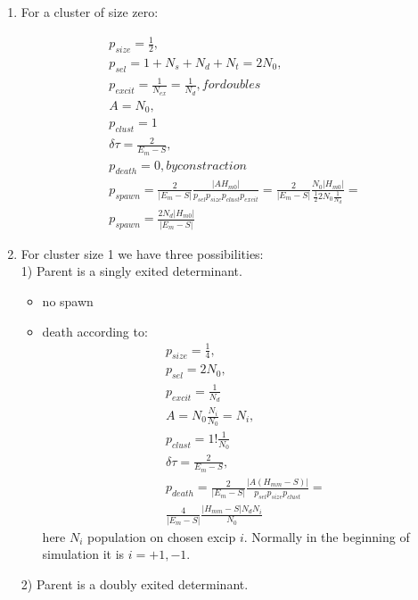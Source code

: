 \documentclass[twoside,english]{uiofysmaster}
\theoremstyle{definition}
\begin{document}
\begin{enumerate}
\item For a cluster of size zero:

\begin{align}
p_{size} = \frac{1}{2},\\
p_{sel} = 1+N_{s}+N_{d}+N_{t} = 2N_0,\\
p_{excit}=\frac{1}{N_{ex}} = \frac{1}{N_d}, for doubles\\
A = N_0,\\
p_{clust}=1\\
\delta \tau = \frac{2}{E_m  - S},\\
p_{death}=0, by constraction\\
p_{spawn} = \frac{2}{|E_m  - S|} \frac{|AH_{m0}|}{ p_{sel}  p_{size} p_{clust}p_{excit} }=
\frac{2}{|E_m  - S|} \frac{N_0|H_{m0}|}{ \frac{1}{2}  2N_0 \frac{1}{N_d} }=\\
p_{spawn} = \frac{2N_d|H_{m0}|}{|E_m  - S|} 
\end{align}
 
\item For cluster size 1 we have three possibilities:\\
1) Parent is a singly exited determinant.

\begin{itemize}
	\item no spawn
	\item death according to:
\begin{align}
p_{size} = \frac{1}{4},\\
p_{sel} =  2N_0,\\
p_{excit}= \frac{1}{N_d}\\
A = N_0\frac{N_i}{N_0}=N_i,\\
p_{clust}=1!\frac{1}{N_0}\\
\delta \tau = \frac{2}{E_m  - S},\\
p_{death} = \frac{2}{|E_m - S|} \frac{|A(H_{mm}-S)|}{ p_{sel}  p_{size} p_{clust} }=\\
\frac{4}{|E_m  - S|} \frac{|H_{mm}-S|N_dN_i}{N_0 }
\end{align}
here $N_i$ population on chosen excip $i$. Normally in the beginning of simulation it is $i= +1,-1$.
\end{itemize}

2) Parent is a doubly exited determinant.


\end{enumerate}
\end{document}
